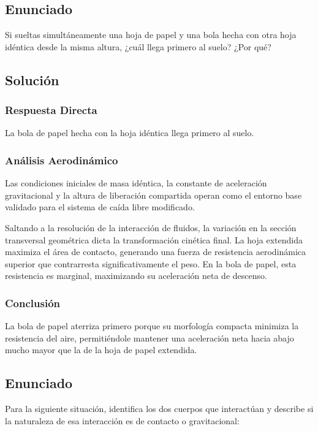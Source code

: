 \documentclass[12pt, a4paper]{article}
\begin{document}
\newpage

\subsection*{Enunciado}
Si sueltas simultáneamente una hoja de papel y una bola hecha con otra hoja idéntica desde la misma altura, ¿cuál llega primero al suelo? ¿Por qué?

\subsection*{Solución}

\subsubsection*{Respuesta Directa}
La bola de papel hecha con la hoja idéntica llega primero al suelo.

\subsubsection*{Análisis Aerodinámico}
Las condiciones iniciales de masa idéntica, la constante de aceleración gravitacional y la altura de liberación compartida operan como el entorno base validado para el sistema de caída libre modificado.

Saltando a la resolución de la interacción de fluidos, la variación en la sección transversal geométrica dicta la transformación cinética final. La hoja extendida maximiza el área de contacto, generando una fuerza de resistencia aerodinámica superior que contrarresta significativamente el peso. En la bola de papel, esta resistencia es marginal, maximizando su aceleración neta de descenso.

\subsubsection*{Conclusión}
La bola de papel aterriza primero porque su morfología compacta minimiza la resistencia del aire, permitiéndole mantener una aceleración neta hacia abajo mucho mayor que la de la hoja de papel extendida.

\newpage

\subsection*{Enunciado}

Para la siguiente situación, identifica los dos cuerpos que interactúan y describe si la naturaleza de esa interacción es de contacto o gravitacional:
\end{document}
